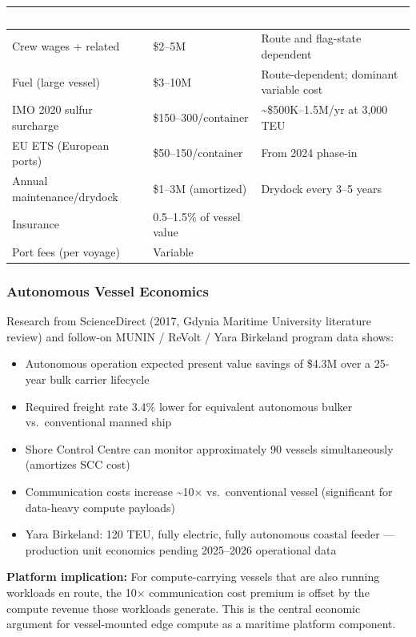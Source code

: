 \documentclass[11pt,letterpaper]{article}
\newcommand{\tableheader}[1]{\textbf{\sffamily\textcolor{white}{#1}}}
\begin{document}
\begin{center}
\begin{tabularx}{\textwidth}{L{4cm}C{3cm}X}
\toprule
{}
\tableheader{Cost Item} & \tableheader{Annual Range} & \tableheader{Notes} \\
\midrule
Crew wages + related & \$2--5M & Route and flag-state dependent \\
Fuel (large vessel) & \$3--10M & Route-dependent; dominant variable cost \\
IMO 2020 sulfur surcharge & \$150--300/container & \textasciitilde{}\$500K--1.5M/yr at 3,000 TEU \\
EU ETS (European ports) & \$50--150/container & From 2024 phase-in \\
Annual maintenance/drydock & \$1--3M (amortized) & Drydock every 3--5 years \\
Insurance & 0.5--1.5\% of vessel value & \\
Port fees (per voyage) & Variable & \\
\bottomrule
\end{tabularx}
\end{center}

\subsubsection{Autonomous Vessel Economics}

Research from ScienceDirect (2017, Gdynia Maritime University literature review) and
follow-on MUNIN / ReVolt / Yara Birkeland program data shows:
\begin{itemize}[itemsep=2pt]
  \item Autonomous operation expected present value savings of \$4.3M over a 25-year bulk carrier lifecycle
  \item Required freight rate 3.4\% lower for equivalent autonomous bulker vs.\ conventional manned ship
  \item Shore Control Centre can monitor approximately 90 vessels simultaneously (amortizes SCC cost)
  \item Communication costs increase \textasciitilde{}10$\times$ vs.\ conventional vessel (significant for data-heavy compute payloads)
  \item Yara Birkeland: 120 TEU, fully electric, fully autonomous coastal feeder --- production unit economics pending 2025--2026 operational data
\end{itemize}

\textbf{Platform implication:} For compute-carrying vessels that are also running
workloads en route, the 10$\times$ communication cost premium is offset by the compute
revenue those workloads generate. This is the central economic argument for vessel-mounted
edge compute as a maritime platform component.
\end{document}
